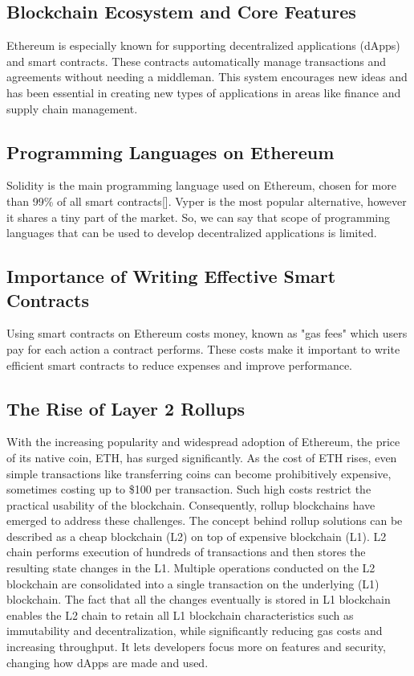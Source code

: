 \subsection{Blockchain Ecosystem and Core Features}
Ethereum is especially known for supporting decentralized applications (dApps) and smart contracts. These contracts automatically manage transactions and agreements without needing a middleman. This system encourages new ideas and has been essential in creating new types of applications in areas like finance and supply chain management.

\subsection{Programming Languages on Ethereum}
Solidity is the main programming language used on Ethereum, chosen for more than 99\% of all smart contracts[]. Vyper is the most popular alternative, however it shares a tiny part of the market. So, we can say that scope of programming languages that can be used to develop decentralized applications is limited.

\subsection{Importance of Writing Effective Smart Contracts}
Using smart contracts on Ethereum costs money, known as "gas fees" which users pay for each action a contract performs. These costs make it important to write efficient smart contracts to reduce expenses and improve performance.

\subsection{The Rise of Layer 2 Rollups}
With the increasing popularity and widespread adoption of Ethereum, the price of its native coin, ETH, has surged significantly. As the cost of ETH rises, even simple transactions like transferring coins can become prohibitively expensive, sometimes costing up to \$100 per transaction. Such high costs restrict the practical usability of the blockchain. Consequently, rollup blockchains have emerged to address these challenges. The concept behind rollup solutions can be described as a cheap blockchain (L2) on top of expensive blockchain (L1). L2 chain performs execution of hundreds of transactions and then stores the resulting state changes in the L1. Multiple operations conducted on the L2 blockchain are consolidated into a single transaction on the underlying (L1) blockchain. The fact that all the changes eventually is stored in L1 blockchain enables the L2 chain to retain all L1 blockchain characteristics such as immutability and decentralization, while significantly reducing gas costs and increasing throughput. It lets developers focus more on features and security, changing how dApps are made and used.


